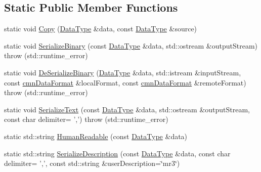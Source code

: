 \subsection*{Static Public Member Functions}
\begin{DoxyCompactItemize}
\item 
static void \hyperlink{classcmn_data_3_01vct_frame4x4_3_01__element_type_00_01__row_major_01_4_01_4_a4426479c175cd9a23317ce3c5f7035e0}{Copy} (\hyperlink{classcmn_data_3_01vct_frame4x4_3_01__element_type_00_01__row_major_01_4_01_4_abf4e17a9d0af654027bedb454326d1d2}{Data\-Type} \&data, const \hyperlink{classcmn_data_3_01vct_frame4x4_3_01__element_type_00_01__row_major_01_4_01_4_abf4e17a9d0af654027bedb454326d1d2}{Data\-Type} \&source)
\item 
static void \hyperlink{classcmn_data_3_01vct_frame4x4_3_01__element_type_00_01__row_major_01_4_01_4_ae4c46f7df40645f6ac02d410c531d761}{Serialize\-Binary} (const \hyperlink{classcmn_data_3_01vct_frame4x4_3_01__element_type_00_01__row_major_01_4_01_4_abf4e17a9d0af654027bedb454326d1d2}{Data\-Type} \&data, std\-::ostream \&output\-Stream)  throw (std\-::runtime\-\_\-error)
\item 
static void \hyperlink{classcmn_data_3_01vct_frame4x4_3_01__element_type_00_01__row_major_01_4_01_4_a88ad73d245e1903211b4bee08711279b}{De\-Serialize\-Binary} (\hyperlink{classcmn_data_3_01vct_frame4x4_3_01__element_type_00_01__row_major_01_4_01_4_abf4e17a9d0af654027bedb454326d1d2}{Data\-Type} \&data, std\-::istream \&input\-Stream, const \hyperlink{classcmn_data_format}{cmn\-Data\-Format} \&local\-Format, const \hyperlink{classcmn_data_format}{cmn\-Data\-Format} \&remote\-Format)  throw (std\-::runtime\-\_\-error)
\item 
static void \hyperlink{classcmn_data_3_01vct_frame4x4_3_01__element_type_00_01__row_major_01_4_01_4_a42f6b34c9c9c971cc769b549284e59f9}{Serialize\-Text} (const \hyperlink{classcmn_data_3_01vct_frame4x4_3_01__element_type_00_01__row_major_01_4_01_4_abf4e17a9d0af654027bedb454326d1d2}{Data\-Type} \&data, std\-::ostream \&output\-Stream, const char delimiter= ',')  throw (std\-::runtime\-\_\-error)
\item 
static std\-::string \hyperlink{classcmn_data_3_01vct_frame4x4_3_01__element_type_00_01__row_major_01_4_01_4_a65a73dfe39eabd7ae911eea642daafc6}{Human\-Readable} (const \hyperlink{classcmn_data_3_01vct_frame4x4_3_01__element_type_00_01__row_major_01_4_01_4_abf4e17a9d0af654027bedb454326d1d2}{Data\-Type} \&data)
\item 
static std\-::string \hyperlink{classcmn_data_3_01vct_frame4x4_3_01__element_type_00_01__row_major_01_4_01_4_af3fc5d3aa101e07a618547e950e5e456}{Serialize\-Description} (const \hyperlink{classcmn_data_3_01vct_frame4x4_3_01__element_type_00_01__row_major_01_4_01_4_abf4e17a9d0af654027bedb454326d1d2}{Data\-Type} \&data, const char delimiter= ',', const std\-::string \&user\-Description=\char`\"{}mr3\char`\"{})

\end{DoxyCompactItemize}
